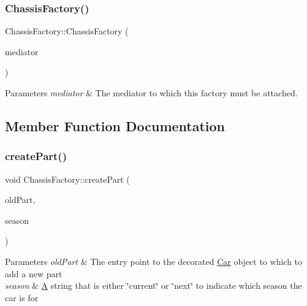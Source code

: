 \subsubsection{\texorpdfstring{Chassis\+Factory()}{ChassisFactory()}}
{\footnotesize\ttfamily Chassis\+Factory\+::\+Chassis\+Factory (\begin{DoxyParamCaption}\item[{\hyperlink{classDepartmentMediator}{Department\+Mediator} $\ast$}]{mediator }\end{DoxyParamCaption})}


\begin{DoxyParams}{Parameters}
{\em mediator} & The mediator to which this factory must be attached. \\
\hline
\end{DoxyParams}


\subsection{Member Function Documentation}
\mbox{\label{classChassisFactory_aeeb7d210e8c3ca1a3e3b2998705b0d90}} 
\subsubsection{\texorpdfstring{create\+Part()}{createPart()}}
{\footnotesize\ttfamily void Chassis\+Factory\+::create\+Part (\begin{DoxyParamCaption}\item[{\hyperlink{classDepartmentOutput}{Department\+Output} $\ast$}]{old\+Part,  }\item[{string}]{season }\end{DoxyParamCaption})\hspace{0.3cm}{\ttfamily [virtual]}}


\begin{DoxyParams}{Parameters}
{\em old\+Part} & The entry point to the decorated \hyperlink{classCar}{Car} object to which to add a new part \\
\hline
{\em season} & \hyperlink{classA}{A} string that is either \char`\"{}current\char`\"{} or \char`\"{}next\char`\"{} to indicate which season the car is for \\
\hline
\end{DoxyParams}


